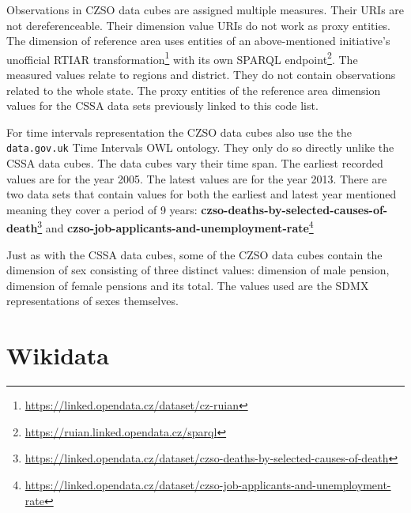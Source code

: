 Observations in CZSO data cubes are assigned multiple measures. Their URIs are not dereferenceable. Their dimension value URIs do not work as proxy entities. The dimension of reference area uses entities of an above-mentioned initiative's unofficial RTIAR transformation\footnote{\href{https://linked.opendata.cz/dataset/cz-ruian}{https://linked.opendata.cz/dataset/cz-ruian}} with its own SPARQL endpoint\footnote{\href{https://ruian.linked.opendata.cz/sparql}{https://ruian.linked.opendata.cz/sparql}}. The measured values relate to regions and district. They do not contain observations related to the whole state. The proxy entities of the reference area dimension values for the CSSA data sets previously linked to this code list. 

For time intervals representation the CZSO data cubes also use the the \verb|data.gov.uk| Time Intervals OWL ontology. They only do so directly unlike the CSSA data cubes. The data cubes vary their time span. The earliest recorded values are for the year 2005. The latest values are for the year 2013. There are two data sets that contain values for both the earliest and latest year mentioned meaning they cover a period of 9 years: \textbf{czso-deaths-by-selected-causes-of-death}\footnote{\href{https://linked.opendata.cz/dataset/czso-deaths-by-selected-causes-of-death}{https://linked.opendata.cz/dataset/czso-deaths-by-selected-causes-of-death}} and \textbf{czso-job-applicants-and-unemployment-rate}\footnote{\href{https://linked.opendata.cz/dataset/czso-job-applicants-and-unemployment-rate}{https://linked.opendata.cz/dataset/czso-job-applicants-and-unemployment-rate}}

Just as with the CSSA data cubes, some of the CZSO data cubes contain the dimension of sex consisting of three distinct values: dimension of male pension, dimension of female pensions and its total. The values used are the SDMX representations of sexes themselves.

\section{Wikidata}

